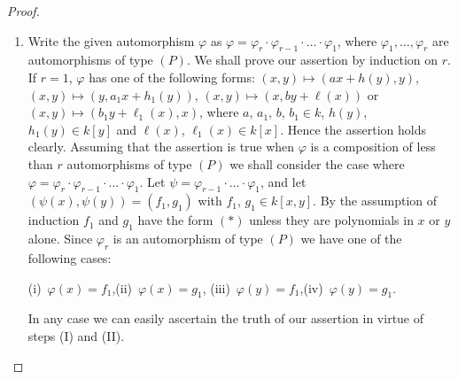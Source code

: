\begin{proof}
\begin{enumerate}
\item Write the given automorphism $\varphi$ as
  $\varphi=\varphi_{r}\cdot \varphi_{r-1}\cdot\ldots\cdot
  \varphi_{1}$, where $\varphi_{1},\ldots,\varphi_{r}$ are
  automorphisms of type $(P)$. We shall prove our assertion by
  induction on $r$. If $r=1$, $\varphi$ has one of the following
  forms: $(x,y)\mapsto (ax+h(y),y)$, $(x,y)\mapsto
  (y,a_{1}x+h_{1}(y))$, $(x,y)\mapsto (x,by+\ell(x))$ or $(x,y)\mapsto
  (b_{1}y+\ell_{1}(x),x)$, where $a$, $a_{1}$, $b$, $b_{1}\in k$,
  $h(y)$, $h_{1}(y)\in k[y]$ and $\ell(x)$, $\ell_{1}(x)\in
  k[x]$. Hence the assertion holds clearly. Assuming that the
  assertion is true when $\varphi$ is a composition of less than $r$
  automorphisms of type $(P)$ we shall consider the case where
  $\varphi=\varphi_{r}\cdot
  \varphi_{r-1}\cdot\ldots\cdot\varphi_{1}$. Let
  $\psi=\varphi_{r-1}\cdot\ldots\cdot\varphi_{1}$, and let
  $(\psi(x),\psi(y))=(f_{1},g_{1})$ with $f_{1}$, $g_{1}\in
  k[x,y]$. By the assumption of induction $f_{1}$ and $g_{1}$ have the
  form $(\ast)$ unless they are polynomials in $x$ or $y$ alone. Since
  $\varphi_{r}$ is an automorphism of type $(P)$ we have one of the
  following cases:
\begin{center}
  (i)~$\varphi(x)=f_{1}$,\quad (ii)~$\varphi(x)=g_{1}$,\quad
  (iii)~$\varphi(y)=f_{1}$,\quad (iv)~$\varphi(y)=g_{1}$.
\end{center}
In any case we can easily ascertain the truth of our assertion in
virtue of steps (I) and (II).
\end{enumerate}
\end{proof}

